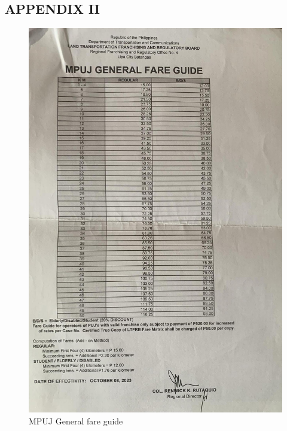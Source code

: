 \documentclass{icsthesis}
\begin{document}
\begin{mainmatter}
\section{APPENDIX II}
\begin{figure}[!h]
    \centering
        \includegraphics[scale=0.25]{./figures/ltfrb/mpuj.jpeg}
    \caption{MPUJ General fare guide}
\end{figure}

\newpage


\end{mainmatter}
\end{document}
